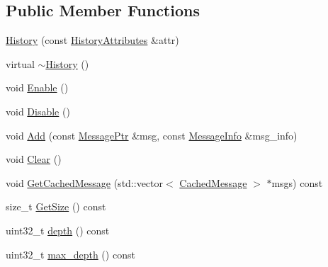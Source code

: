 \subsection*{Public Member Functions}
\begin{DoxyCompactItemize}
\item 
\hyperlink{classapollo_1_1cyber_1_1transport_1_1History_a00fc9a50f3d3f8657c36174ef1b12894}{History} (const \hyperlink{structapollo_1_1cyber_1_1transport_1_1HistoryAttributes}{History\-Attributes} \&attr)
\item 
virtual \hyperlink{classapollo_1_1cyber_1_1transport_1_1History_a587dfce1602c9b27c936144d04a95417}{$\sim$\-History} ()
\item 
void \hyperlink{classapollo_1_1cyber_1_1transport_1_1History_a47de5fc2f21b1dd17d2a16d530ba613a}{Enable} ()
\item 
void \hyperlink{classapollo_1_1cyber_1_1transport_1_1History_a19e4751f0545392b6aeb703c74771318}{Disable} ()
\item 
void \hyperlink{classapollo_1_1cyber_1_1transport_1_1History_ad468ac9221d8cd8f647034e302af76f6}{Add} (const \hyperlink{classapollo_1_1cyber_1_1transport_1_1History_a4c11720b1c1d14eafb9fec5436a0d7c0}{Message\-Ptr} \&msg, const \hyperlink{classapollo_1_1cyber_1_1transport_1_1MessageInfo}{Message\-Info} \&msg\-\_\-info)
\item 
void \hyperlink{classapollo_1_1cyber_1_1transport_1_1History_a7af63e269651bd78f39ecd80b2d4f548}{Clear} ()
\item 
void \hyperlink{classapollo_1_1cyber_1_1transport_1_1History_abd26ece6879ece861fdcbd145a6cb377}{Get\-Cached\-Message} (std\-::vector$<$ \hyperlink{structapollo_1_1cyber_1_1transport_1_1History_1_1CachedMessage}{Cached\-Message} $>$ $\ast$msgs) const 
\item 
size\-\_\-t \hyperlink{classapollo_1_1cyber_1_1transport_1_1History_afe153bb3a7b9092f6e5a195b8899d2c7}{Get\-Size} () const 
\item 
uint32\-\_\-t \hyperlink{classapollo_1_1cyber_1_1transport_1_1History_ae190a8c127778cfca6d09cf22bbe06dc}{depth} () const 
\item 
uint32\-\_\-t \hyperlink{classapollo_1_1cyber_1_1transport_1_1History_a2002e82d861dd993254e04151ec4a97d}{max\-\_\-depth} () const 
\end{DoxyCompactItemize}
